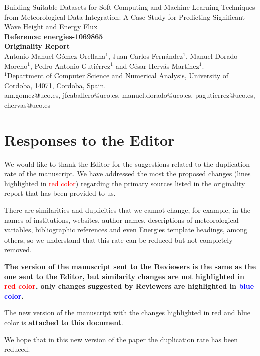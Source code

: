 \documentclass[a4paper,twoside,11pt]{article}
\makeatletter
\newcommand{\myAuthors}{Antonio Manuel Gómez-Orellana$^1$, Juan Carlos Fernández$^1$, Manuel Dorado-Moreno$^1$, Pedro Antonio Gutiérrez$^1$ and César Hervás-Martínez$^1$.}
\newcommand{\myEmail}{\Letter \quad  am.gomez@uco.es, jfcaballero@uco.es, manuel.dorado@uco.es, pagutierrez@uco.es, chervas@uco.es}
\newcommand{\myTitle}{Building Suitable Datasets for Soft Computing and Machine Learning Techniques from Meteorological Data Integration: A Case Study for Predicting Significant Wave Height and Energy Flux}
\newcommand{\myJournal}{\textbf{Reference: energies-1069865}}
\newcommand{\myRefPaper}{\textbf{Originality Report}}
\newcommand{\myDepartament}{$^1$Department of Computer Science and Numerical Analysis, University of Cordoba, 14071, Cordoba, Spain.}
\makeatother
\begin{document}
\thispagestyle{plain}

\begin{center}
	{\LARGE\myTitle} \vspace{0.5cm} \\
	{\LARGE\myJournal} \vspace{0.5cm} \\
	{\Large\myRefPaper} \vspace{0.5cm} \\
	\myAuthors \vspace{0.5cm} \\
	{\myDepartament} \vspace{0.5cm} \\
	{\myEmail}
\end{center}


\section*{Responses to the Editor}
We would like to thank the Editor for the suggestions related to the duplication rate of the manuscript. We have addressed the most the proposed changes (lines highlighted in \textcolor{red}{red color}) regarding the primary sources listed in the originality report that has been provided to us.

There are similarities and duplicities that we cannot change, for example, in the names of institutions, websites, author names, descriptions of meteorological variables, bibliographic references and even Energies template headings, among others, so we understand that this rate can be reduced but not completely removed. 

\textbf{The version of the manuscript sent to the Reviewers is the same as the one sent to the Editor, but similarity changes are not highlighted in \textcolor{red}{red color}, only changes suggested by Reviewers are highlighted in \textcolor{blue}{blue color}.}

The new version of the manuscript with the changes highlighted in red and blue color is \underline{\textbf{attached to this document}}.

We hope that in this new version of the paper the duplication rate has been reduced.
\end{document}
